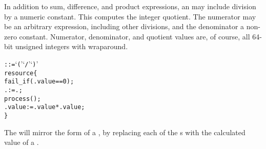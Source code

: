 In addition to sum, difference, and product expressions, an  may include division by a numeric constant.
This computes the integer quotient.
The numerator may be an arbitrary expression, including other divisions, and the denominator a non-zero constant.
Numerator, denominator, and quotient values are, of course, all 64-bit unsigned integers with wraparound.

\begin{alltt}\ttSyn
   ::= `('  `/'   `)' \ttSem
  resource \{
    fail_if(.value == 0);
    . := .;
    process();
    .value := .value * .value;
  \} \ttSyn
\end{alltt}

The  will mirror the form of a , by replacing each of the s with the calculated value of a .\\


